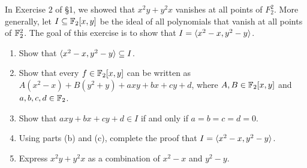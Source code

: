 \begin{exercise}{13}
In Exercise $2$ of \S 1, we showed that $x^2 y + y^2 x$ vanishes at all points of $F_2^2$.
More generally, let $I\subseteq \mathbb{F}_2[x,y]$ be the ideal of all polynomials that vanish at all points of $\mathbb{F}_2^2$. 
The goal of this exercise is to show that $I = \langle x^2 - x, y^2 - y\rangle$.
\begin{enumerate}
    \item Show that $\langle x^2 - x, y^2 - y\rangle \subseteq I$.
    \item Show that every $f\in \mathbb{F}_2[x,y]$ can be written as $A(x^2 - x) + B(y^2 + y) + axy + bx + cy + d$, where $A,B\in \mathbb{F}_2[x,y]$ and $a,b,c,d\in \mathbb{F}_2$.
    \item Show that $axy + bx + cy + d\in I$ if and only if $a=b=c=d=0$.
    \item Using parts (b) and (c), complete the proof that $I = \langle x^2 - x, y^2- y\rangle$.
    \item Express $x^2 y + y^2 x$ as a combination of $x^2 - x$ and $y^2 - y$.
\end{enumerate}
\end{exercise}
